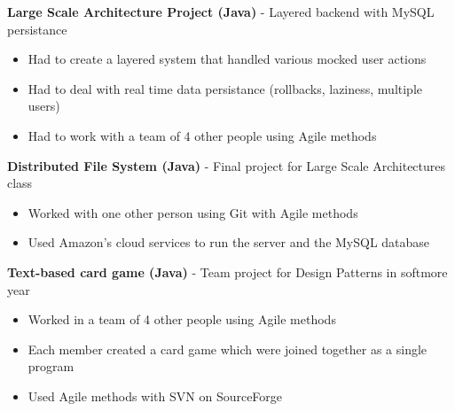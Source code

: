 \documentclass[margin,line, 11pt]{resume}
\begin{document}
\begin{resume}
     \textbf{Large Scale Architecture Project (Java)} - Layered backend with MySQL persistance
     \begin{itemize}
      \item Had to create a layered system that handled various mocked user actions
      \item Had to deal with real time data persistance (rollbacks, laziness, multiple users)
      \item Had to work with a team of 4 other people using Agile methods
     \end{itemize}

     \textbf{Distributed File System (Java)} - Final project for Large Scale Architectures class
	\begin{itemize}
	  \item Worked with one other person using Git with Agile methods
	  \item Used Amazon's cloud services to run the server and the MySQL database
	\end{itemize}

    \textbf{Text-based card game (Java)} - Team project for Design Patterns in softmore year
	\begin{itemize}
	  \item Worked in a team of 4 other people using Agile methods
	  \item Each member created a card game which were joined together as a single program
	  \item Used Agile methods with SVN on SourceForge
	\end{itemize}

  

% 

%      
     


\end{resume}
\end{document}
